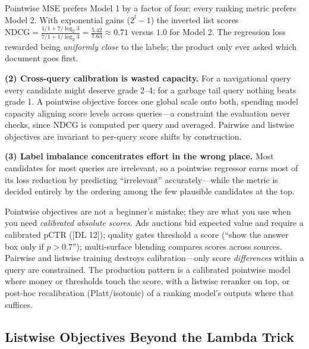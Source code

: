 Pointwise MSE prefers Model 1 by a factor of four; every ranking metric prefers Model 2. With exponential gains ($2^{l}-1$) the inverted list scores $\text{NDCG} = \frac{1/1 + 7/\log_2 3}{7/1 + 1/\log_2 3} = \frac{5.42}{7.63} \approx 0.71$ versus $1.0$ for Model 2. The regression loss rewarded being \textit{uniformly close} to the labels; the product only ever asked which document goes first.

\textbf{(2) Cross-query calibration is wasted capacity.} For a navigational query every candidate might deserve grade 2--4; for a garbage tail query nothing beats grade 1. A pointwise objective forces one global scale onto both, spending model capacity aligning score levels across queries---a constraint the evaluation never checks, since NDCG is computed per query and averaged. Pairwise and listwise objectives are invariant to per-query score shifts by construction.

\textbf{(3) Label imbalance concentrates effort in the wrong place.} Most candidates for most queries are irrelevant, so a pointwise regressor earns most of its loss reduction by predicting ``irrelevant'' accurately---while the metric is decided entirely by the ordering among the few plausible candidates at the top.

\begin{keyinsight}
Pointwise objectives are not a beginner's mistake; they are what you use when you need \textit{calibrated absolute scores}. Ads auctions bid expected value and require a calibrated pCTR ([DL 12]); quality gates threshold a score (``show the answer box only if $p > 0.7$''); multi-surface blending compares scores across sources. Pairwise and listwise training destroys calibration---only score \textit{differences} within a query are constrained. The production pattern is a calibrated pointwise model where money or thresholds touch the score, with a listwise reranker on top, or post-hoc recalibration (Platt/isotonic) of a ranking model's outputs where that suffices.
\end{keyinsight}

\subsection{Listwise Objectives Beyond the Lambda Trick}

